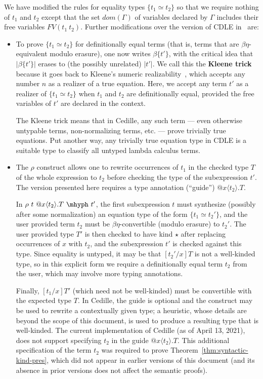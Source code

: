 \documentclass{article}
\begin{document}
We have modified the rules for equality types $\{ t_1 \simeq t_2 \}$ so that we require
nothing of $t_1$ and $t_2$ except that the set $\textit{dom}(\Gamma)$ of variables
declared by $\Gamma$ includes their free variables $\textit{FV}(t_1\ t_2)$.  Further modifications
over the version of CDLE in~\cite{stump18} are:
\begin{itemize}
\item To prove $\{ t_1 \simeq t_2\}$ for definitionally equal terms (that is,
  terms that are \(\beta\eta\)-equivalent modulo erasure), one now writes $\beta\{t'\}$,
  with the critical idea that $|\beta\{t'\}|$ erases to (the possibly unrelated) $|t'|$.
  We call this the \textbf{Kleene trick} because it goes back to Kleene's numeric
  realizability~\cite{Kle65_Classical-Extensions-of-Intuitionistic-Mathematics},
  which accepts any number $n$ as a realizer 
  of a true equation.  Here, we accept any term $t'$ as a realizer of $\{ t_1
  \simeq t_2\}$ when \(t_1\) and \(t_2\) are definitionally equal, provided the
  free variables of \(t'\) are declared in the context.
  
  The Kleene trick means that in Cedille, any such term --- even otherwise untypable
  terms, non-normalizing terms, etc. --- prove trivially true equations.
  Put another way, any trivially true equation type in CDLE is a suitable type
  to classify all untyped lambda calculus terms.
\item The \(\rho\) construct allows one to rewrite occurrences of \(t_1\) in the
  checked type \(T\) of the whole expression to \(t_2\) before checking
  the type of the subexpression \(t'\).
  The version presented here requires a type annotation (``guide'') \(@x\langle
  t_2 \rangle.T\).

  In \(\rho\ t\ @x\langle t_2 \rangle.T\ \mhyph\ t'\), the first subexpression
  \(t\) must synthesize (possibly after some normalization) an equation type of
  the form \(\{t_1 \simeq t_2'\}\), and the user provided term \(t_2\) must be
  \(\beta\eta\)-convertible (modulo erasure) to \(t_2'\).
  The user provided type \(T'\) is then checked to have kind \(\star\) after
  replacing occurrences of \(x\) with \(t_2\), and the subexpression \(t'\) is
  checked against this type.
  Since equality is untyped, it may be that \([t_2'/x]T\) is not a well-kinded
  type, so in this explicit form we require a definitionally equal term \(t_2\)
  from the user, which may involve more typing annotations. 
  
  Finally, \([t_1/x]T'\) (which need not be well-kinded) must be convertible
  with the expected type \(T\).
  In Cedille, the guide is optional and the construct may be used to rewrite a
  contextually given type; a heuristic, whose details are beyond the scope of
  this document, is used to produce a resulting type that is well-kinded.
  The current implementation of Cedille (as of April 13, 2021), does not support
  specifying \(t_2\) in the guide \(@x\langle t_2 \rangle.T\).
  This additional specification of the term \(t_2\) was required to prove
  Theorem~\ref{thm:syntactic-kind-pres}, which did not appear in earlier
  versions of this document (and its absence in prior versions does not affect
  the semantic proofs).


\end{itemize}
\end{document}
